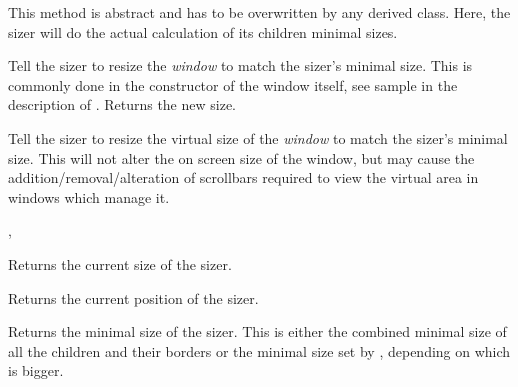 \label{wxsizercalcmin}


This method is abstract and has to be overwritten by any derived class.
Here, the sizer will do the actual calculation of its children minimal sizes.

\label{wxsizerfit}


Tell the sizer to resize the {\it window} to match the sizer's minimal size. This
is commonly done in the constructor of the window itself, see sample in the description
of . Returns the new size.

\label{wxsizerfitinside}


Tell the sizer to resize the virtual size of the {\it window} to match the sizer's
minimal size.  This will not alter the on screen size of the window, but may cause
the addition/removal/alteration of scrollbars required to view the virtual area in
windows which manage it.


,\rtfsp
{}

\label{wxsizergetsize}


Returns the current size of the sizer.

\label{wxsizergetposition}


Returns the current position of the sizer.

\label{wxsizergetminsize}


Returns the minimal size of the sizer. This is either the combined minimal
size of all the children and their borders or the minimal size set by 
, depending on which is bigger.

\label{wxsizerlayout}

